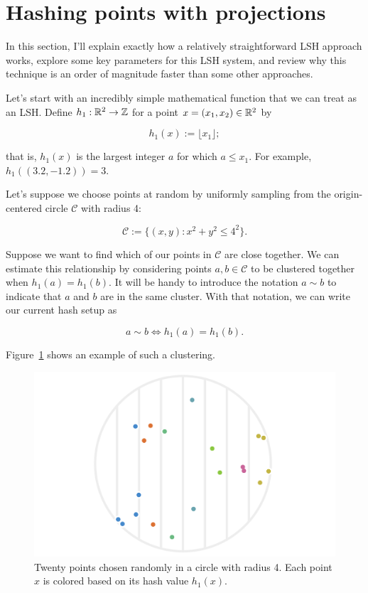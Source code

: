 \documentclass[20pt,]{extarticle}
\begin{document}
\section{Hashing points with
projections}\label{hashing-points-with-projections}

In this section, I'll explain exactly how a relatively straightforward
LSH approach works, explore some key parameters for this LSH system, and
review why this technique is an order of magnitude faster than some
other approaches.

Let's start with an incredibly simple mathematical function that we can
treat as an LSH. Define \(h_1:\mathbb{R}^2 \to \mathbb{Z}\) for a point
\(x=(x_1, x_2)\in\mathbb{R}^2\) by

\[ h_1(x) := \lfloor x_1 \rfloor; \]

that is, \(h_1(x)\) is the largest integer \(a\) for which \(a\le x_1.\)
For example, \(h_1((3.2, -1.2)) = 3.\)

Let's suppose we choose points at random by uniformly sampling from the
origin-centered circle \(\mathcal C\) with radius 4:

\[ \mathcal C := \{ (x, y) : x^2 + y^2 \le 4^2 \}. \]

Suppose we want to find which of our points in \(\mathcal C\) are close
together. We can estimate this relationship by considering points
\(a, b \in \mathcal C\) to be clustered together when
\(h_1(a) = h_1(b).\) It will be handy to introduce the notation
\(a \sim b\) to indicate that \(a\) and \(b\) are in the same cluster.
With that notation, we can write our current hash setup as

\[ a \sim b \iff h_1(a) = h_1(b). \]

Figure~\ref{fig:fig1} shows an example of such a clustering.

\begin{figure}
\centering
\includegraphics{images/lsh_image1_v2.png}
\caption{Twenty points chosen randomly in a circle with radius 4. Each
point \(x\) is colored based on its hash value
\(h_1(x).\)}\label{fig:fig1}
\end{figure}
\end{document}
